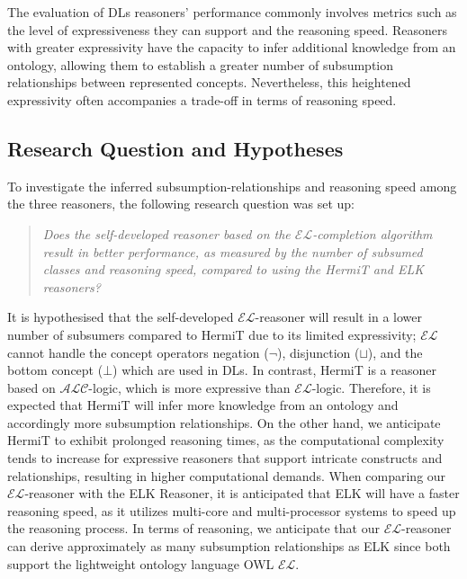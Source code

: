 \documentclass[a4paper]{article}
\theoremstyle{plain}
\theoremstyle{definition}
\begin{document}
The evaluation of DLs reasoners' performance commonly involves metrics such as the level of expressiveness they can support and the reasoning speed. Reasoners with greater expressivity have the capacity to infer additional knowledge from an ontology, allowing them to establish a greater number of subsumption relationships between represented concepts. Nevertheless, this heightened expressivity often accompanies a trade-off in terms of reasoning speed.

\subsection{Research Question and Hypotheses}
To investigate the inferred subsumption-relationships and reasoning speed among the three reasoners, the following research question was set up:

    \begin{quote}
         \textit{Does the self-developed reasoner based on the $\mathcal{EL}$-completion algorithm result in better performance, as measured by the number of subsumed classes and reasoning speed, compared to using the HermiT and ELK reasoners?}

    \end{quote}

    It is hypothesised that the self-developed $\mathcal{EL}$-reasoner will result in a lower number of subsumers compared to HermiT due to its limited expressivity; $\mathcal{EL}$ cannot handle the concept operators negation ($\neg$), disjunction ($\sqcup$), and the bottom concept ($\bot$) which are used in DLs. In contrast, HermiT is a reasoner based on $\mathcal{ALC}$-logic, which is more expressive than $\mathcal{EL}$-logic. Therefore, it is expected that HermiT will infer more knowledge from an ontology and accordingly more subsumption relationships. On the other hand, we anticipate HermiT to exhibit prolonged reasoning times, as the computational complexity tends to increase for expressive reasoners that support intricate constructs and relationships, resulting in higher computational demands. When comparing our $\mathcal{EL}$-reasoner with the ELK Reasoner, it is anticipated that ELK will have a faster reasoning speed, as it utilizes multi-core and multi-processor systems to speed up the reasoning process. In terms of reasoning, we anticipate that our $\mathcal{EL}$-reasoner can derive approximately as many subsumption relationships as ELK since both support the lightweight ontology language OWL $\mathcal{EL}$.
    
\end{document}
